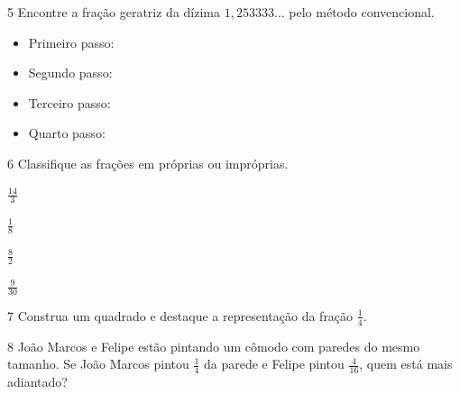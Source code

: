 

\num{5} Encontre a fração geratriz da dízima $1,253333\ldots{}$ pelo método
convencional.

\begin{itemize}[itemsep=-7mm]
\item \parbox{16ex}{Primeiro passo:} 
\item \parbox{16ex}{Segundo passo:}  
\item \parbox{16ex}{Terceiro passo:} 
\item \parbox{16ex}{Quarto passo:}   
\end{itemize}


\num{6} Classifique as frações em próprias ou impróprias.

\begin{multicols}{2}
\begin{escolha}[itemsep=0pt]
    \item $\frac{14}{3}$ 
    \item$\frac{1}{8}$ 
    \item $\frac{8}{2}$ 
    \item $\frac{9}{30}$ 
\end{escolha}
\end{multicols}

\num{7} Construa um quadrado e destaque a representação da fração
$\frac{1}{4}$.

\medskip
{} 
\medskip

\num{8} João Marcos e Felipe estão pintando um cômodo com paredes do mesmo
tamanho. Se João Marcos pintou $\frac{1}{4}$ da parede e Felipe pintou
$\frac{4}{16}$, quem está mais adiantado?



